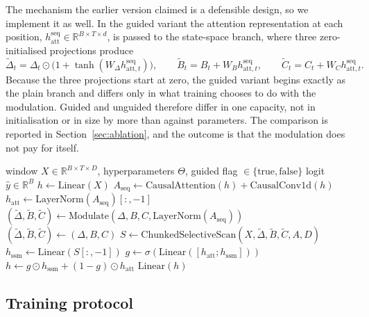 \documentclass[pdflatex,sn-mathphys-ay]{sn-jnl}
\theoremstyle{thmstyleone}%
\theoremstyle{thmstyletwo}%
\theoremstyle{thmstyletwo}%
\begin{document}
The mechanism the earlier version claimed is a defensible design, so we implement it as well. In the
guided variant the attention representation at each position, $h^{\text{seq}}_{\text{att}} \in
\mathbb{R}^{B \times T \times d}$, is passed to the state-space branch, where three zero-initialised
projections produce
\begin{equation}\label{eq:guided}
	\tilde{\Delta}_t = \Delta_t \odot \bigl(1 + \tanh(W_\Delta h^{\text{seq}}_{\text{att},t})\bigr),
	\qquad
	\tilde{B}_t = B_t + W_B h^{\text{seq}}_{\text{att},t},
	\qquad
	\tilde{C}_t = C_t + W_C h^{\text{seq}}_{\text{att},t}.
\end{equation}
Because the three projections start at zero, the guided variant begins exactly as the plain branch
and differs only in what training chooses to do with the modulation. Guided and unguided therefore
differ in one capacity, not in initialisation or in size by more than
\paramGuided{} against \paramProposed{} parameters. The comparison is reported in
Section~\ref{sec:ablation}, and the outcome is that the modulation does not pay for itself.

\begin{algorithm}[H]
	\caption{MambaATM, as implemented}
	\label{alg:mambaatm}
	\begin{algorithmic}[1]
		\Require window $X \in \mathbb{R}^{B \times T \times D}$, hyperparameters $\Theta$,
		guided flag $\in \{\text{true},\text{false}\}$
		\Ensure logit $\hat{y} \in \mathbb{R}^{B}$
		\State $h \leftarrow \mathrm{Linear}(X)$
		\State $A_{\text{seq}} \leftarrow \mathrm{CausalAttention}(h) + \mathrm{CausalConv1d}(h)$
		\State $h_{\text{att}} \leftarrow \mathrm{LayerNorm}(A_{\text{seq}})[:, -1]$
		\State $(\tilde{\Delta}, \tilde{B}, \tilde{C}) \leftarrow
		\mathrm{Modulate}(\Delta, B, C, \mathrm{LayerNorm}(A_{\text{seq}}))$
		\Else
		\State $(\tilde{\Delta}, \tilde{B}, \tilde{C}) \leftarrow (\Delta, B, C)$
		\EndIf
		\State $S \leftarrow \mathrm{ChunkedSelectiveScan}(X, \tilde{\Delta}, \tilde{B}, \tilde{C}, A, D)$
		\State $h_{\text{ssm}} \leftarrow \mathrm{Linear}(S[:, -1])$
		\State $g \leftarrow \sigma(\mathrm{Linear}([h_{\text{att}}; h_{\text{ssm}}]))$
		\State $h \leftarrow g \odot h_{\text{ssm}} + (1-g) \odot h_{\text{att}}$
		\State \Return $\mathrm{Linear}(h)$
	\end{algorithmic}
\end{algorithm}

\subsection{Training protocol}
\end{document}
